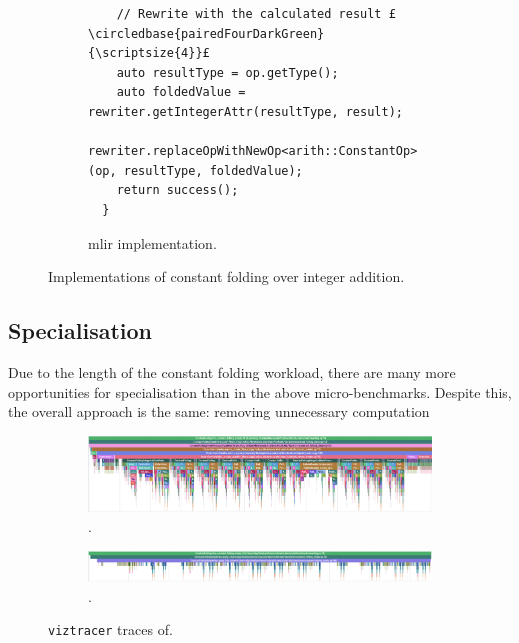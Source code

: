\begin{figure}[H]
\begin{subfigure}[b]{0.5\textwidth}
\begin{verbatim}
    // Rewrite with the calculated result £\circledbase{pairedFourDarkGreen}{\scriptsize{4}}£
    auto resultType = op.getType();
    auto foldedValue = rewriter.getIntegerAttr(resultType, result);
    rewriter.replaceOpWithNewOp<arith::ConstantOp>(op, resultType, foldedValue);
    return success();
  }
        \end{verbatim}
        \captionsetup{name=Listing}
        \caption{\ac{mlir} implementation.}
        \label{listing:constant-folding-impl-mlir}
    \end{subfigure}
    \vspace{1em}
    \captionsetup{name=Listing}
    \caption{Implementations of constant folding over integer addition.}
    \label{listing:constant-folding-impl}
\end{figure}


\subsection{Specialisation}
\label{sec:specialising-pattern-rewriting-specialisation}

Due to the length of the constant folding workload, there are many more opportunities for specialisation than in the above micro-benchmarks. Despite this, the overall approach is the same: removing unnecessary computation


\begin{figure}[H]
    \centering
    \begin{subfigure}[b]{\textwidth}
        \centering
        \includegraphics[width=\textwidth]{images/specialising_optimising_xdsl_rewriting/custom_constant_fold.png}
        \captionsetup{width=0.8\textwidth}
        \caption{.}
        \label{fig:constant-fold-original-viztracer}
    \end{subfigure}
    \begin{subfigure}[b]{\textwidth}
        \centering
        \includegraphics[width=\textwidth]{images/specialising_optimising_xdsl_rewriting/optimised_constant_fold.png}
        \captionsetup{width=0.8\textwidth}
        \caption{.}
        \label{fig:constant-fold-optimised-viztracer}
    \end{subfigure}
    \caption{\texttt{viztracer} traces of.}
    \label{fig:constant-fold-viztracer}
\end{figure}

